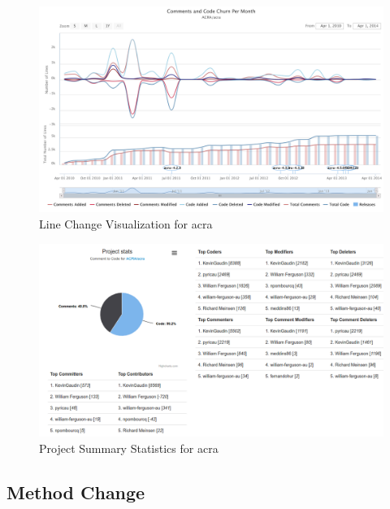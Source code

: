 \begin{landscape}
 \thispagestyle{empty}
 \begin{figure}
  \centering
        \includegraphics[width=1.5\textwidth]{images/lines_visual_acra}
    \caption{Line Change Visualization for acra}
    \label{fig:line_visual_acra}
 \end{figure}
\end{landscape}
\pagestyle{plain}

\begin{landscape}
\thispagestyle{empty}
 \begin{figure}
  \centering
        \includegraphics[width=1.5\textwidth]{images/table_visual}
    \caption{Project Summary Statistics for acra}
    \label{fig:project_summary_stats}
 \end{figure}
\end{landscape}
\pagestyle{plain}

\subsection{Method Change}

